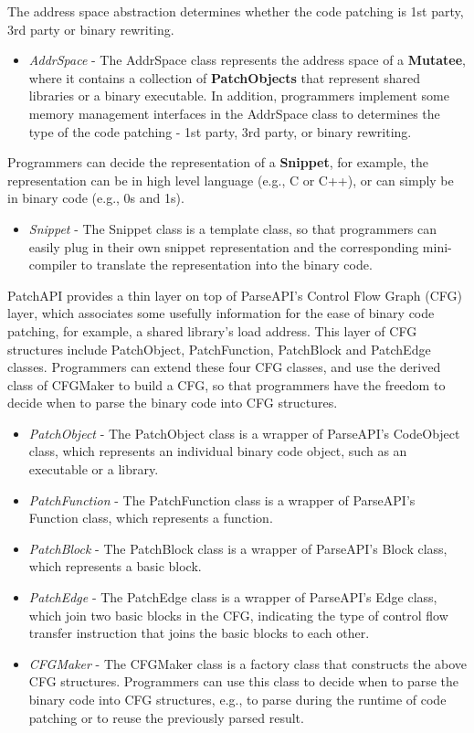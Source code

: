 The address space abstraction determines whether the code patching is 1st party,
3rd party or binary rewriting.
\begin{itemize}
\item \emph{AddrSpace} - The AddrSpace class represents the address space of a
    \textbf{Mutatee}, where it contains a collection of \textbf{PatchObjects} that represent
    shared libraries or a binary executable. In addition, programmers implement
    some memory management interfaces in the AddrSpace class to determines the
    type of the code patching - 1st party, 3rd party, or binary rewriting.
\end{itemize}
Programmers can decide the representation of a \textbf{Snippet}, for example, the
representation can be in high level language (e.g., C or C++), or can simply be
in binary code (e.g., 0s and 1s).
\begin{itemize}
\item \emph{Snippet} - The Snippet class is a template class, so that programmers can
    easily plug in their own snippet representation and the corresponding
    mini-compiler to translate the representation into the binary code.
\end{itemize}
PatchAPI provides a thin layer on top of ParseAPI's Control Flow Graph (CFG)
layer, which associates some usefully information for the ease of binary code
patching, for example, a shared library's load address. This layer of CFG
structures include PatchObject, PatchFunction, PatchBlock and PatchEdge classes.
Programmers can extend these four CFG classes, and use the derived class of
CFGMaker to build a CFG, so that programmers have the freedom to decide when to
parse the binary code into CFG structures.
\begin{itemize}
\item \emph{PatchObject} - The PatchObject class is a wrapper of ParseAPI's CodeObject
    class, which represents an individual binary code object, such as an
    executable or a library.
\item \emph{PatchFunction} - The PatchFunction class is a wrapper of ParseAPI's
    Function class, which represents a function.
\item \emph{PatchBlock} - The PatchBlock class is a wrapper of ParseAPI's Block class,
    which represents a basic block.
\item \emph{PatchEdge} - The PatchEdge class is a wrapper of ParseAPI's Edge class,
    which join two basic blocks in the CFG, indicating the type of control flow
    transfer instruction that joins the basic blocks to each other.
\item \emph{CFGMaker} - The CFGMaker class is a factory class that constructs the above
    CFG structures. Programmers can use this class to decide when to parse the
    binary code into CFG structures, e.g., to parse during the runtime of code
    patching or to reuse the previously parsed result.
\end{itemize}
